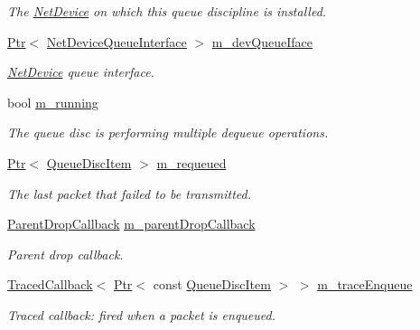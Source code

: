 \begin{DoxyCompactItemize}
\begin{DoxyCompactList}\small\item\em The \hyperlink{classns3_1_1NetDevice}{Net\+Device} on which this queue discipline is installed. \end{DoxyCompactList}\item 
\hyperlink{classns3_1_1Ptr}{Ptr}$<$ \hyperlink{classns3_1_1NetDeviceQueueInterface}{Net\+Device\+Queue\+Interface} $>$ \hyperlink{classns3_1_1QueueDisc_a265febf26e8325dbb3ba1f905ea1912d}{m\+\_\+dev\+Queue\+Iface}
\begin{DoxyCompactList}\small\item\em \hyperlink{classns3_1_1NetDevice}{Net\+Device} queue interface. \end{DoxyCompactList}\item 
bool \hyperlink{classns3_1_1QueueDisc_a6d00230b60de29bd32d0a2488290380f}{m\+\_\+running}
\begin{DoxyCompactList}\small\item\em The queue disc is performing multiple dequeue operations. \end{DoxyCompactList}\item 
\hyperlink{classns3_1_1Ptr}{Ptr}$<$ \hyperlink{classns3_1_1QueueDiscItem}{Queue\+Disc\+Item} $>$ \hyperlink{classns3_1_1QueueDisc_a43cae3d282e28914b1b5e1b782c7e854}{m\+\_\+requeued}
\begin{DoxyCompactList}\small\item\em The last packet that failed to be transmitted. \end{DoxyCompactList}\item 
\hyperlink{classns3_1_1QueueDisc_abcb41646ec54f8206bc14df2c93762f4}{Parent\+Drop\+Callback} \hyperlink{classns3_1_1QueueDisc_ac0ecab7418e3e1e6453f9cf1b194b74f}{m\+\_\+parent\+Drop\+Callback}
\begin{DoxyCompactList}\small\item\em Parent drop callback. \end{DoxyCompactList}\item 
\hyperlink{classns3_1_1TracedCallback}{Traced\+Callback}$<$ \hyperlink{classns3_1_1Ptr}{Ptr}$<$ const \hyperlink{classns3_1_1QueueDiscItem}{Queue\+Disc\+Item} $>$ $>$ \hyperlink{classns3_1_1QueueDisc_a7614788f662bc6df8c98a646f494dd61}{m\+\_\+trace\+Enqueue}
\begin{DoxyCompactList}\small\item\em Traced callback\+: fired when a packet is enqueued. \end{DoxyCompactList}\item 

\end{DoxyCompactItemize}

